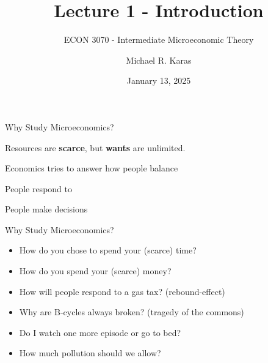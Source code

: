 \documentclass[12pt,t]{beamer}
\author{Michael R. Karas}
\title{Lecture 1 - Introduction}
\subtitle{ECON 3070 - Intermediate Microeconomic Theory}
\date{January 13, 2025}
\begin{document}
\begin{frame}
  \titlepage
\end{frame}

\begin{frame}{Why Study Microeconomics?}
  \begin{center}
    Resources are \textbf{scarce}, but \textbf{wants} are unlimited.
  \end{center}

  \pause\bigskip
  \begin{center}
    Economics tries to answer how people balance 
  \end{center}

  \pause\bigskip
  \begin{center}
    People respond to 
  \end{center}

  \pause\bigskip
  \begin{center}
    People make decisions 
  \end{center}
\end{frame}

\begin{frame}{Why Study Microeconomics?}
  \begin{itemize}
    \item How do you chose to spend your (scarce) time? 
    \item How do you spend your (scarce) money?
  \end{itemize}
  
  \pause\bigskip
  \begin{itemize}
    \item How will people respond to a gas tax? (rebound-effect) 
    \item Why are B-cycles always broken? (tragedy of the commons)
  \end{itemize}
  
  \pause\bigskip
  \begin{itemize}
    \item Do I watch one more episode or go to bed? 
    \item How much pollution should we allow?
  \end{itemize}
\end{frame}
\end{document}
